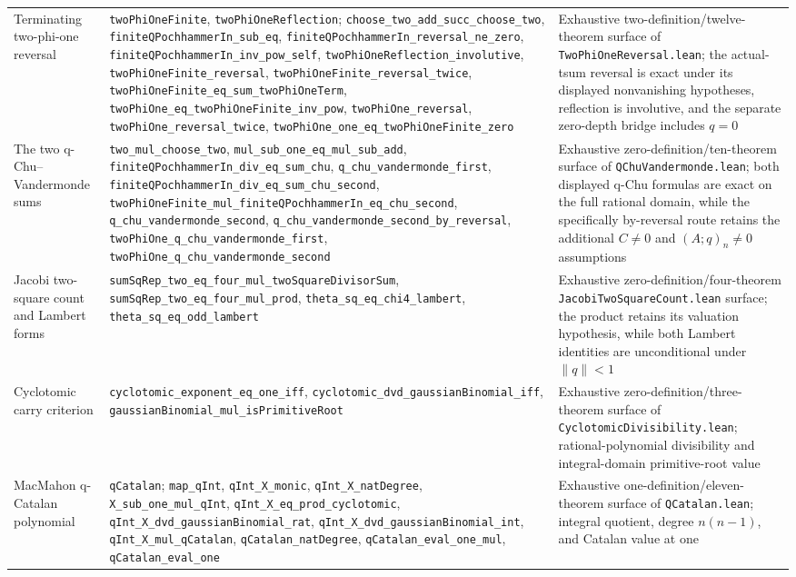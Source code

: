\documentclass[11pt,oneside]{article}
\theoremstyle{definition}
\theoremstyle{remark}
\begin{document}
\begin{longtable}{@{}>{\raggedright\arraybackslash}p{} >{\raggedright\arraybackslash}p{} >{\raggedright\arraybackslash}p{}@{}}
Terminating two-phi-one reversal & \nolinkurl{twoPhiOneFinite}, \nolinkurl{twoPhiOneReflection}; \nolinkurl{choose_two_add_succ_choose_two}, \nolinkurl{finiteQPochhammerIn_sub_eq}, \nolinkurl{finiteQPochhammerIn_reversal_ne_zero}, \nolinkurl{finiteQPochhammerIn_inv_pow_self}, \nolinkurl{twoPhiOneReflection_involutive}, \nolinkurl{twoPhiOneFinite_reversal}, \nolinkurl{twoPhiOneFinite_reversal_twice}, \nolinkurl{twoPhiOneFinite_eq_sum_twoPhiOneTerm}, \nolinkurl{twoPhiOne_eq_twoPhiOneFinite_inv_pow}, \nolinkurl{twoPhiOne_reversal}, \nolinkurl{twoPhiOne_reversal_twice}, \nolinkurl{twoPhiOne_one_eq_twoPhiOneFinite_zero} & Exhaustive two-definition/twelve-theorem surface of \nolinkurl{TwoPhiOneReversal.lean}; the actual-tsum reversal is exact under its displayed nonvanishing hypotheses, reflection is involutive, and the separate zero-depth bridge includes \(q=0\) \\
The two q-Chu--Vandermonde sums & \nolinkurl{two_mul_choose_two}, \nolinkurl{mul_sub_one_eq_mul_sub_add}, \nolinkurl{finiteQPochhammerIn_div_eq_sum_chu}, \nolinkurl{q_chu_vandermonde_first}, \nolinkurl{finiteQPochhammerIn_div_eq_sum_chu_second}, \nolinkurl{twoPhiOneFinite_mul_finiteQPochhammerIn_eq_chu_second}, \nolinkurl{q_chu_vandermonde_second}, \nolinkurl{q_chu_vandermonde_second_by_reversal}, \nolinkurl{twoPhiOne_q_chu_vandermonde_first}, \nolinkurl{twoPhiOne_q_chu_vandermonde_second} & Exhaustive zero-definition/ten-theorem surface of \nolinkurl{QChuVandermonde.lean}; both displayed q-Chu formulas are exact on the full rational domain, while the specifically by-reversal route retains the additional \(C\ne0\) and \((A;q)_n\ne0\) assumptions \\
Jacobi two-square count and Lambert forms & \nolinkurl{sumSqRep_two_eq_four_mul_twoSquareDivisorSum}, \nolinkurl{sumSqRep_two_eq_four_mul_prod}, \nolinkurl{theta_sq_eq_chi4_lambert}, \nolinkurl{theta_sq_eq_odd_lambert} & Exhaustive zero-definition/four-theorem \nolinkurl{JacobiTwoSquareCount.lean} surface; the product retains its valuation hypothesis, while both Lambert identities are unconditional under \(\lVert q\rVert<1\) \\
Cyclotomic carry criterion & \nolinkurl{cyclotomic_exponent_eq_one_iff}, \nolinkurl{cyclotomic_dvd_gaussianBinomial_iff}, \nolinkurl{gaussianBinomial_mul_isPrimitiveRoot} & Exhaustive zero-definition/three-theorem surface of \nolinkurl{CyclotomicDivisibility.lean}; rational-polynomial divisibility and integral-domain primitive-root value \\
MacMahon q-Catalan polynomial & \nolinkurl{qCatalan}; \nolinkurl{map_qInt}, \nolinkurl{qInt_X_monic}, \nolinkurl{qInt_X_natDegree}, \nolinkurl{X_sub_one_mul_qInt}, \nolinkurl{qInt_X_eq_prod_cyclotomic}, \nolinkurl{qInt_X_dvd_gaussianBinomial_rat}, \nolinkurl{qInt_X_dvd_gaussianBinomial_int}, \nolinkurl{qInt_X_mul_qCatalan}, \nolinkurl{qCatalan_natDegree}, \nolinkurl{qCatalan_eval_one_mul}, \nolinkurl{qCatalan_eval_one} & Exhaustive one-definition/eleven-theorem surface of \nolinkurl{QCatalan.lean}; integral quotient, degree \(n(n-1)\), and Catalan value at one \\

\end{longtable}
\end{document}
